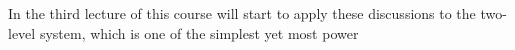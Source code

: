 In the third lecture of this course will start to apply these discussions to the two-level system, which is one of the simplest yet most power